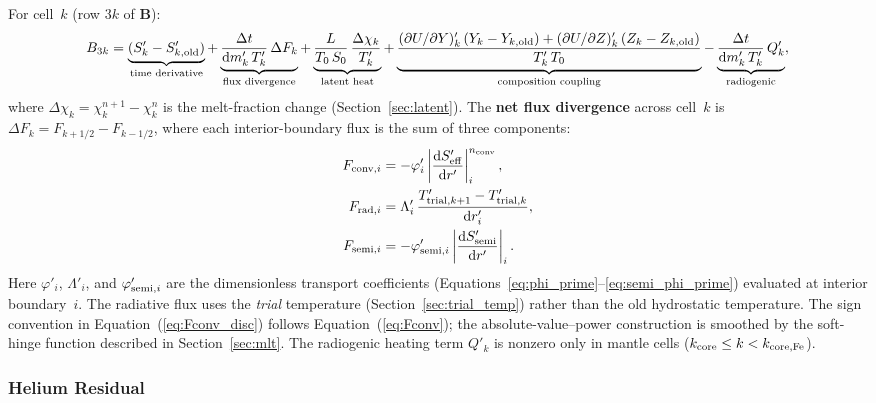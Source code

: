 \documentclass{aastex631}
\newcommand{\dd}{\mathrm{d}}
\newcommand{\pp}{\partial}
\begin{document}
For cell~$k$ (row $3k$ of $\mathbf{B}$):
\begin{equation}\label{eq:BS}
  B_{3k}
  = \underbrace{(S'_k - S'_{k,\rm old})}_{\text{time derivative}}
  + \underbrace{\frac{\Delta t}{\dd m'_k\,T'_k}\,\Delta F_k}_{\text{flux divergence}}
  + \underbrace{\frac{L}{T_0\,S_0}\,\frac{\Delta\chi_k}{T'_k}}_{\text{latent heat}}
  + \underbrace{\frac{(\pp U/\pp Y)'_k\,(Y_k - Y_{k,\rm old})
        + (\pp U/\pp Z)'_k\,(Z_k - Z_{k,\rm old})}{T'_k\,T_0}}_{\text{composition coupling}}
  - \underbrace{\frac{\Delta t}{\dd m'_k\,T'_k}\,Q'_k}_{\text{radiogenic}},
\end{equation}
where $\Delta\chi_k = \chi_k^{n+1} - \chi_k^n$ is the melt-fraction
change (Section~\ref{sec:latent}).  The \textbf{net flux divergence}
across cell~$k$ is $\Delta F_k = F_{k+1/2} - F_{k-1/2}$, where each
interior-boundary flux is the sum of three components:
\begin{align}
  F_{{\rm conv},i}
    &= -\varphi'_i
       \left|\frac{\dd S'_{\rm eff}}{\dd r'}\right|_i^{n_{\rm conv}},
  \label{eq:Fconv_disc}\\
  F_{{\rm rad},i}
    &= \Lambda'_i\,
       \frac{T'_{{\rm trial},k+1} - T'_{{\rm trial},k}}
            {\dd r'_i},
  \label{eq:Frad_disc}\\
  F_{{\rm semi},i}
    &= -\varphi'_{{\rm semi},i}
       \left|\frac{\dd S'_{\rm semi}}{\dd r'}\right|_i.
  \label{eq:Fsemi_disc}
\end{align}
Here $\varphi'_i$, $\Lambda'_i$, and $\varphi'_{{\rm semi},i}$ are
the dimensionless transport coefficients
(Equations~\ref{eq:phi_prime}--\ref{eq:semi_phi_prime}) evaluated at
interior boundary~$i$.  The radiative flux uses the \emph{trial}
temperature (Section~\ref{sec:trial_temp}) rather than the old
hydrostatic temperature.  The sign convention in
Equation~(\ref{eq:Fconv_disc}) follows Equation~(\ref{eq:Fconv});
the absolute-value--power construction is smoothed by the soft-hinge
function described in Section~\ref{sec:mlt}.  The radiogenic
heating term $Q'_k$ is nonzero only in mantle cells
($k_{\rm core}\le k < k_{\rm core,Fe}$).

\subsubsection{Helium Residual}
\end{document}
